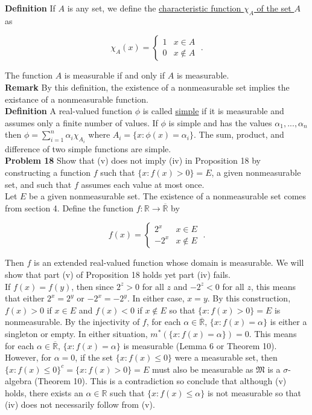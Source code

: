 \documentclass[a4paper]{article}
\begin{document}
{\bf Definition} If $A$ is any set, we define the \underline{characteristic function $\chi_A$ of the set $A$} as

$$ \chi_A(x) = \begin{cases}
1 & x \in A\\
0 & x \not\in A
\end{cases} \;.$$

The function $A$ is measurable if and only if $A$ is measurable.\\

{\bf Remark} By this definition, the existence of a nonmeasurable set implies the existance of a nonmeasurable function. \\

{\bf Definition} A real-valued function $\phi$ is called \underline{simple} if it is measurable and assumes only a finite number of values. If $\phi$ is simple and has the values $\alpha_1,...,\alpha_n$ then $\phi = \sum_{i=1}^n \alpha_i \chi_{A_i}$ where $A_i = \{x : \phi(x) = \alpha_i\}$. The sum, product, and difference of two simple functions are simple. \\

{\bf Problem 18} Show that (v) does not imply (iv) in Proposition 18 by constructing a function $f$ such that $\{x : f(x) > 0 \} = E$, a given nonmeasurable set, and such that $f$ assumes each value at most once. \\

Let $E$ be a given nonmeasurable set. The existence of a nonmeasurable set comes from section 4. Define the function $f: \mathbb{R} \rightarrow \overline{\mathbb{R}}$ by

$$f(x) = \begin{cases} 2^x & x \in E \\ -2^x & x \not\in E \end{cases} \;. $$

Then $f$ is an extended real-valued function whose domain is measurable. We will show that part (v) of Proposition 18 holds yet part (iv) fails. \\

If $f(x) = f(y)$, then since $2^z > 0$ for all $z$ and $-2^z < 0$ for all $z$, this means that either $2^x = 2^y$ or $-2^x = -2^y$. In either case, $x = y$. By this construction, $f(x) > 0$ if $x \in E$ and $f(x) < 0$ if $x \not\in E$ so that $\{x : f(x) > 0 \} = E$ is nonmeasurable. By the injectivity of $f$, for each $\alpha \in \overline{\mathbb{R}}$, $\{x : f(x) = \alpha\}$ is either a singleton or empty. In either situation, $m^*(\{x : f(x) = \alpha \}) = 0$. This means for each $\alpha \in \overline{\mathbb{R}}$, $\{x : f(x) = \alpha \}$ is measurable (Lemma 6 or Theorem 10). However, for $\alpha = 0$, if the set $\{x : f(x) \leq 0\}$ were a measurable set, then $\{x : f(x) \leq 0\}^c = \{x : f(x) > 0\} =E$ must also be measurable as $\mathfrak{M}$ is a $\sigma$-algebra (Theorem 10). This is a contradiction so conclude that although (v) holds, there exists an $\alpha \in \mathbb{R}$ such that $\{x : f(x) \leq \alpha\}$ is not measurable so that (iv) does not necessarily follow from (v). \\
\end{document}
